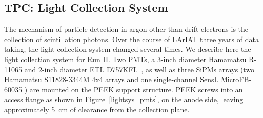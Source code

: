 \subsection{TPC: Light Collection System}\label{sec:TPCLight}
The mechanism of particle detection in argon other than drift electrons is the collection of scintillation photons.  Over the course of LArIAT three years of data taking, the light collection system changed several times. We describe here the light collection system for Run II. Two PMTs, a 3-inch diameter Hamamatsu R-11065 and 2-inch diameter ETL D757KFL~\cite{lightsys-pmttests}, as well as three SiPMs arrays (two Hamamatsu S11828-3344M 4x4 arrays and one single-channel SensL MicroFB-60035 ) are mounted on the PEEK support structure. PEEK screws into an access flange as shown in Figure~\ref{lightsys_pmts}, on the anode side, leaving  approximately 5~cm of clearance from the collection plane.  

